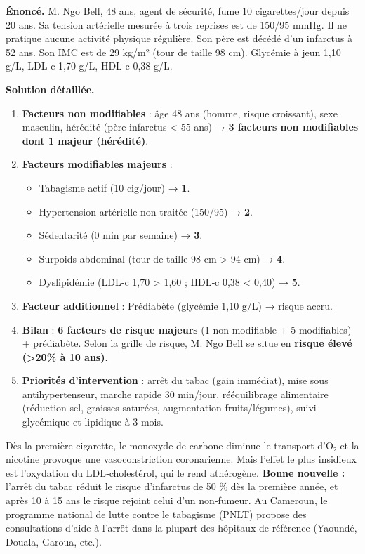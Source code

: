 \documentclass[11pt]{article}
\begin{document}
\begin{exoresolu}
\textbf{Énoncé.} M. Ngo Bell, 48 ans, agent de sécurité, fume 10 cigarettes/jour depuis 20 ans. Sa tension artérielle mesurée à trois reprises est de 150/95 mmHg. Il ne pratique aucune activité physique régulière. Son père est décédé d'un infarctus à 52 ans. Son IMC est de 29 kg/m² (tour de taille 98 cm). Glycémie à jeun 1,10 g/L, LDL‑c 1,70 g/L, HDL‑c 0,38 g/L.

\textbf{Solution détaillée.}
\tcblower
\begin{enumerate}
  \item \textbf{Facteurs non modifiables} : âge 48 ans (homme, risque croissant), sexe masculin, hérédité (père infarctus < 55 ans) → \textbf{3 facteurs non modifiables dont 1 majeur (hérédité)}.
  \item \textbf{Facteurs modifiables majeurs} :
  \begin{itemize}
    \item Tabagisme actif (10 cig/jour) → \textbf{1}.
    \item Hypertension artérielle non traitée (150/95) → \textbf{2}.
    \item Sédentarité (0 min par semaine) → \textbf{3}.
    \item Surpoids abdominal (tour de taille 98 cm > 94 cm) → \textbf{4}.
    \item Dyslipidémie (LDL‑c 1,70 > 1,60 ; HDL‑c 0,38 < 0,40) → \textbf{5}.
  \end{itemize}
  \item \textbf{Facteur additionnel} : Prédiabète (glycémie 1,10 g/L) → risque accru.
  \item \textbf{Bilan} : \textbf{6 facteurs de risque majeurs} (1 non modifiable + 5 modifiables) + prédiabète. Selon la grille de risque, M. Ngo Bell se situe en \textbf{risque élevé (>20\% à 10 ans)}.
  \item \textbf{Priorités d'intervention} : arrêt du tabac (gain immédiat), mise sous antihypertenseur, marche rapide 30 min/jour, rééquilibrage alimentaire (réduction sel, graisses saturées, augmentation fruits/légumes), suivi glycémique et lipidique à 3 mois.
\end{enumerate}
\end{exoresolu}

\begin{savaistu}
Dès la première cigarette, le monoxyde de carbone diminue le transport d'O₂ et la nicotine provoque une vasoconstriction coronarienne. Mais l'effet le plus insidieux est l'oxydation du LDL‑cholestérol, qui le rend athérogène. \textbf{Bonne nouvelle :} l'arrêt du tabac réduit le risque d'infarctus de 50 \% dès la première année, et après 10 à 15 ans le risque rejoint celui d'un non‑fumeur. Au Cameroun, le programme national de lutte contre le tabagisme (PNLT) propose des consultations d'aide à l'arrêt dans la plupart des hôpitaux de référence (Yaoundé, Douala, Garoua, etc.).
\end{savaistu}
\end{document}
